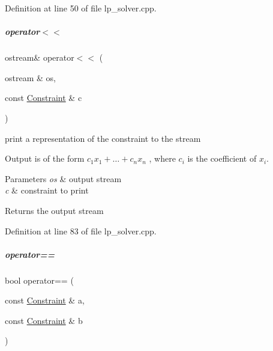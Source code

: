 Definition at line 50 of file lp\+\_\+solver.\+cpp.

\mbox{\label{group___c_l_s_solvers_a7233f9b589a413e310991431039b05b6}} 
\subparagraph{\texorpdfstring{operator$<$$<$}{operator<<}}
{\footnotesize\ttfamily ostream\& operator$<$$<$ (\begin{DoxyParamCaption}\item[{ostream \&}]{os,  }\item[{const \hyperlink{group___c_l_s_solvers_class_l_p___solvers_1_1_constraint}{Constraint} \&}]{c }\end{DoxyParamCaption})\hspace{0.3cm}{\ttfamily [friend]}}



print a representation of the constraint to the stream 

Output is of the form $ c_1 x_1 + \ldots + c_n x_n $ , where $ c_i $ is the coefficient of $ x_i $.


\begin{DoxyParams}{Parameters}
{\em os} & output stream \\
\hline
{\em c} & constraint to print \\
\hline
\end{DoxyParams}
\begin{DoxyReturn}{Returns}
the output stream 
\end{DoxyReturn}


Definition at line 83 of file lp\+\_\+solver.\+cpp.

\mbox{\label{group___c_l_s_solvers_a9411a8f6505608b523a4d5f28014d4c2}} 
\subparagraph{\texorpdfstring{operator==}{operator==}}
{\footnotesize\ttfamily bool operator== (\begin{DoxyParamCaption}\item[{const \hyperlink{group___c_l_s_solvers_class_l_p___solvers_1_1_constraint}{Constraint} \&}]{a,  }\item[{const \hyperlink{group___c_l_s_solvers_class_l_p___solvers_1_1_constraint}{Constraint} \&}]{b }\end{DoxyParamCaption})\hspace{0.3cm}{\ttfamily [friend]}}



